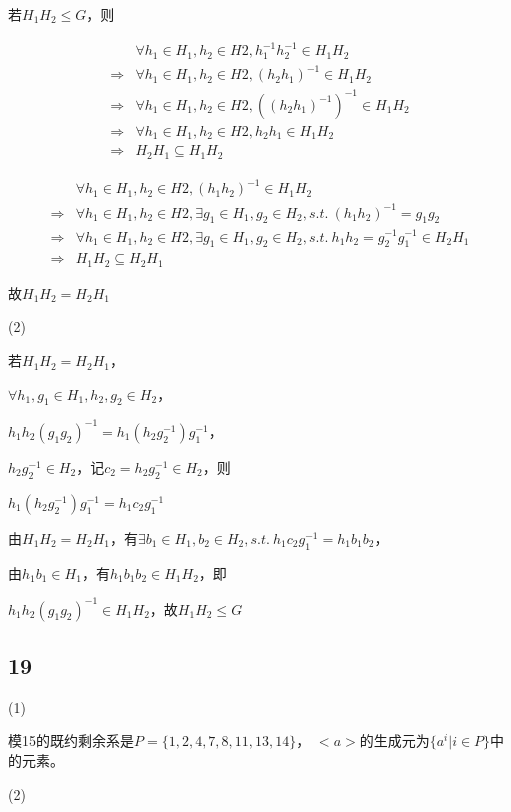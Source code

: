 \documentclass[UTF8]{ctexart}
\begin{document}
若$H_1H_2\leq G$，则

\[
\begin{aligned}
    &\forall h_1\in H_1, h_2\in H2, h_1^{-1}h_2^{-1}\in H_1H_2\\
    \Rightarrow &\forall h_1\in H_1, h_2\in H2, (h_2h_1)^{-1}\in H_1H_2\\
    \Rightarrow &\forall h_1\in H_1, h_2\in H2, ((h_2h_1)^{-1})^{-1}\in H_1H_2\\
    \Rightarrow &\forall h_1\in H_1, h_2\in H2, h_2h_1\in H_1H_2\\
    \Rightarrow & H_2H_1\subseteq H_1H_2
\end{aligned}
\]

\[
\begin{aligned}
    &\forall h_1\in H_1, h_2\in H2, (h_1h_2)^{-1}\in H_1H_2\\
    \Rightarrow &\forall h_1\in H_1, h_2\in H2, \exists g_1\in H_1, g_2\in H_2, s.t.\ (h_1h_2)^{-1} = g_1g_2\\
    \Rightarrow &\forall h_1\in H_1, h_2\in H2, \exists g_1\in H_1, g_2\in H_2, s.t.\ h_1h_2 = g_2^{-1}g_1^{-1}\in H_2H_1\\
    \Rightarrow &H_1H_2\subseteq H_2H_1
\end{aligned}
\]

故$H_1H_2 = H_2H_1$

(2)

若$H_1H_2 = H_2H_1$，

$\forall h_1, g_1\in H_1, h_2, g_2\in H_2$，

$h_1h_2(g_1g_2)^{-1} = h_1(h_2g_2^{-1})g_1^{-1}$，

$h_2g_2^{-1}\in H_2$，记$c_2 = h_2g_2^{-1}\in H_2$，则

$h_1(h_2g_2^{-1})g_1^{-1} = h_1c_2g_1^{-1}$

由$H_1H_2 = H_2H_1$，有$\exists b_1\in H_1, b_2\in H_2, s.t.\ h_1c_2g_1^{-1} = h_1b_1b_2$，

由$h_1b_1\in H_1$，有$h_1b_1b_2\in H_1H_2$，即

$h_1h_2(g_1g_2)^{-1}\in H_1H_2$，故$H_1H_2\leq G$

\subsection*{19}

(1)

模15的既约剩余系是$P = \{1, 2, 4, 7, 8, 11, 13, 14\}$，
$<a>$的生成元为$\{a^{i} | i\in P\}$中的元素。

(2)
\end{document}
